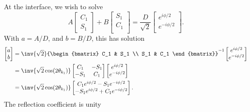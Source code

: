 \begin{enumerate}[(i)]
At the interface, we wish to solve
%
\begin{equation}\label{eqn:gradQuantumProblemSet4Problem3:1181}
A
\begin{bmatrix}
C_1 \\
S_1
\end{bmatrix}
+
B
\begin{bmatrix}
S_1 \\
C_1 \\
\end{bmatrix}
=
\frac{D}{\sqrt{2}}
\begin{bmatrix}
e^{i \phi/2} \\
e^{-i \phi/2} \\
\end{bmatrix}.
\end{equation}
%
With \( a = A/D \), and \( b = B/D \), this has solution
%
\begin{equation}\label{eqn:gradQuantumProblemSet4Problem3:1201}
\begin{aligned}
\begin{bmatrix}
a \\
b
\end{bmatrix}
&=
\inv{\sqrt{2}}
{\begin{bmatrix}
C_1 & S_1 \\
S_1 & C_1
\end{bmatrix}}^{-1}
\begin{bmatrix}
e^{i \phi/2} \\
e^{-i \phi/2} \\
\end{bmatrix}
\\ &=
\inv{\sqrt{2} \cos(2 \theta_{k_1})}
\begin{bmatrix}
C_1 & -S_1 \\
-S_1 & C_1
\end{bmatrix}
\begin{bmatrix}
e^{i \phi/2} \\
e^{-i \phi/2} \\
\end{bmatrix}
\\ &=
\inv{\sqrt{2} \cos(2 \theta_{k_1})}
\begin{bmatrix}
C_1 e^{i \phi/2} -S_1 e^{-i \phi/2} \\
-S_1 e^{i \phi/2} + C_1 e^{-i \phi/2}
\end{bmatrix}.
\end{aligned}
\end{equation}
%
The reflection coefficient is unity
\begin{equation}\label{eqn:gradQuantumProblemSet4Problem3:1221}

\end{equation}
\end{enumerate}
